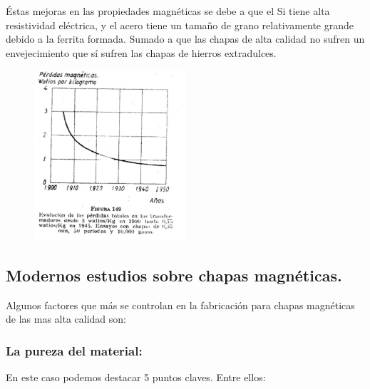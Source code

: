 \documentclass[12pt,a4paper]{article}
\begin{document}
Éstas mejoras en las propiedades magnéticas se debe a que el Si tiene alta resistividad eléctrica, y el acero tiene un tamaño de grano relativamente grande debido a la ferrita formada. Sumado a que las chapas de alta calidad no sufren un envejecimiento que sí sufren las chapas de hierros extradulces.

\begin{figure}[H]    
    \centering         
    \includegraphics[width=0.5\textwidth]{IMAGENES LATEX/3.jpg}
\end{figure}

\subsection{Modernos estudios sobre chapas magnéticas.}

Algunos factores que más se controlan en la fabricación para chapas magnéticas de las mas alta calidad son: 

\subsubsection{La pureza del material:}

En este caso podemos destacar 5 puntos claves. Entre ellos:
\end{document}
